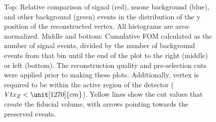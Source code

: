 \begin{figure}[hbtp]
\caption[Vertex y containment cut]{Top: Relative comparison of signal (red), \acrshort{nuone} background (blue), and other background (green) events in the distribution of the y position of the reconstructed vertex. All histograms are area-normalized. Middle and bottom: Cumulative \acrshort{FOM} calculated as the number of signal events, divided by the number of background events from that bin until the end of the plot to the right (middle) or left (bottom). The reconstruction quality and pre-selection cuts were applied prior to making these plots. Additionally, vertex is required to be within the active region of the detector ($Vtx_Z<\unit[1270]{cm}$). Yellow lines show the cut values that create the fiducial volume, with arrows pointing towards the preserved events.}
\label{fig:NuMMFiducialCutY}
\end{figure}

